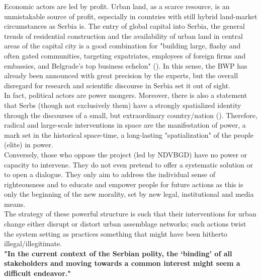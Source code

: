 \documentclass[11pt]{report}
\begin{document}
{{{Economic actors are led by profit.
Urban land, as a scarce resource, is an unmistakable source of profit, especially in countries with still hybrid land-market circumstances as Serbia is.
The entry of global capital into Serbia, the general trends of residential construction and the availability of urban land in central areas of the capital city is a good combination for  
"building large, flashy and often gated communities, targeting expatriates, employees of foreign firms and embassies, and Belgrade’s top business echelon" (\href{Hirt}{\citealt{hirt_belgrade_2009}}).
In this sense, the BWP has already been announced with great precision by the experts, but the overall disregard for research and scientific discourse in Serbia set it out of sight.
\\

In fact, political actors are power mongers. Moreover, there is also a statement that Serbs (though not exclusively them) have a strongly spatialized identity through the discourses of a small, but extraordinary country/nation 
(\href{Savic}{\citealt{savic_where_2014}}).
Therefore, radical and large-scale interventions in space are the manifestation of power, a mark set in the historical space-time, a long-lasting "spatialization" of the people (elite) in power.
\\

Conversely, those who oppose the project (led by NDVBGD) have no power or capacity to intervene. 
They do not even pretend to offer a systematic solution or to open a dialogue.
They only aim to address the individual sense of righteousness and to educate and empower people for future actions as this is only the beginning of the new morality, set by new legal, institutional and media means.
\\

The strategy of these powerful structure is such that their interventions for urban change either disrupt or distort urban assemblage networks; such actions twist the system setting as practices something that might have been hitherto illegal/illegitimate.
\\

\textbf{"In the current context  of  the  Serbian  polity,  the ‘binding’  of  all stakeholders  and  moving  towards  a  common interest  might  seem   a  difficult  endeavor."} \href{Volic}{\cite{volic_belgrade_2012}}



}}}
\end{document}
